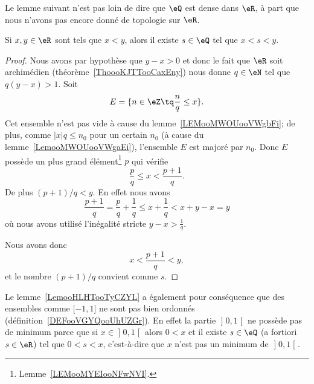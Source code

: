 Le lemme suivant n'est pas loin de dire que \( \eQ\) est dense dans \( \eR\), à part que nous n'avons pas encore donné de topologie sur \( \eR\).
\begin{lemma}       \label{LemooHLHTooTyCZYL}
    Si \( x,y\in \eR\) sont tels que \( x<y\), alors il existe \( s\in \eQ\) tel que \( x<s<y\).
\end{lemma}

\begin{proof}
    Nous avons par hypothèse que \( y-x>0\) et donc le fait que \( \eR\) soit archimédien (théorème~\ref{ThoooKJTTooCaxEny}) nous donne \( q\in \eN\) tel que \( q(y-x)>1\). Soit
    \begin{equation}
        E=\{ n\in \eZ\tq \frac{ n }{ q }\leq x \}.
    \end{equation}
    Cet ensemble n'est pas vide à cause du lemme~\ref{LEMooMWOUooVWgbFi}; de plus, comme \( |x|q \leq n_0\) pour un certain \( n_0 \) (à cause du lemme~\ref{LemooMWOUooVWgaEi}), l'ensemble \( E\) est majoré par \( n_0\). Donc \( E\) possède un plus grand élément\footnote{Lemme~\ref{LEMooMYEIooNFwNVI}.} \( p\) qui vérifie
    \begin{equation}
        \frac{ p }{ q }\leq x<\frac{ p+1 }{ q }.
    \end{equation}
    De plus \( (p+1)/q<y\). En effet nous avons
    \begin{equation}
        \frac{ p+1 }{ q }=\frac{ p }{ q }+\frac{1}{ q }\leq x+\frac{1}{ q }<x+y-x=y
    \end{equation}
    où nous avons utilisé l'inégalité stricte \( y-x>\frac{1}{ q }\).

    Nous avons donc
    \begin{equation}
        x<\frac{ p+1 }{ q }<y,
    \end{equation}
    et le nombre \( (p+1)/q\) convient comme \( s\).
\end{proof}

\begin{remark}      \label{REMooXOIOooHjwMvA}
    Le lemme~\ref{LemooHLHTooTyCZYL} a également pour conséquence que des ensembles comme \( \mathopen[ -1 , 1 \mathclose]\) ne sont pas bien ordonnés (définition~\ref{DEFooVGYQooUhUZGr}). En effet la partie \( \mathopen] 0 , 1 \mathclose[\) ne possède pas de minimum parce que si \( x\in \mathopen] 0 , 1 \mathclose[\) alors \( 0<x\) et il existe \( s\in \eQ\) (a fortiori \( s\in \eR\)) tel que \( 0<s<x\), c'est-à-dire que \( x\) n'est pas un minimum de \( \mathopen] 0 , 1 \mathclose[\).
\end{remark}

